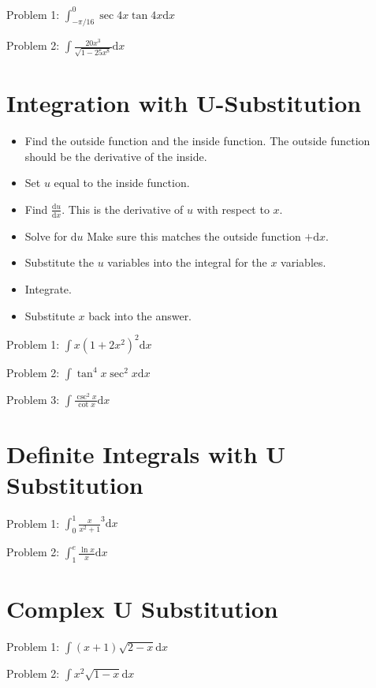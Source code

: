 \documentclass[../abcalc.tex]{subfiles}
\begin{document}
Problem 1: $\int^0_{-\pi/16} \sec 4x \tan 4x \mathrm{d}x$

Problem 2: $\int \frac{20x^3}{\sqrt{1-25x^8}}\mathrm{d}x$
\section{Integration with U-Substitution}
\begin{itemize}
    \item Find the outside function and the inside function. The outside function should be the derivative of the inside.
    \item Set $u$ equal to the inside function.
    \item Find $\frac{\mathrm{d}u}{\mathrm{d}x}$. This is the derivative of $u$ with respect to $x$.
    \item Solve for $\mathrm{d}u$ Make sure this matches the outside function $+\mathrm{d}x$.
    \item Substitute the $u$ variables into the integral for the $x$ variables.
    \item Integrate.
    \item Substitute $x$ back into the answer.
\end{itemize}

Problem 1: $\int x(1+2x^2)^2\mathrm{d}x$

Problem 2: $\int \tan^4 x\sec^2 x\mathrm{d}x$

Problem 3: $\int \frac{\csc^2 x}{\cot x}\mathrm{d}x$
\section{Definite Integrals with U Substitution}
Problem 1: $\int_0^1 \frac{x}{x^2+1}^3 \mathrm{d}x$

Problem 2: $\int_1^e \frac{\ln x}{x}\mathrm{d}x$
\section{Complex U Substitution}
Problem 1: $\int (x+1)\sqrt{2-x}\mathrm{d}x$

Problem 2: $\int x^2 \sqrt{1-x}\mathrm{d}x$
\end{document}
